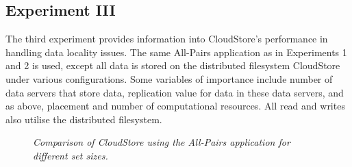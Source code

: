 \documentclass{rspublic}
\begin{document}
\subsection{Experiment III} The third experiment provides information
into CloudStore's performance in handling data locality issues.  The
same All-Pairs application as in Experiments 1 and 2 is used, except all
data is stored on the distributed filesystem CloudStore under various
configurations.  Some variables of importance include number of data
servers that store data, replication value for data in these data
servers, and as above, placement and number of computational resources.
All read and writes also utilise the distributed filesystem.  
\begin{center}
\begin{figure}
\caption{\textit{Comparison of CloudStore using the All-Pairs
application for different set sizes.}}
\label{experiment3}
\end{figure}
\end{center}
\end{document}
